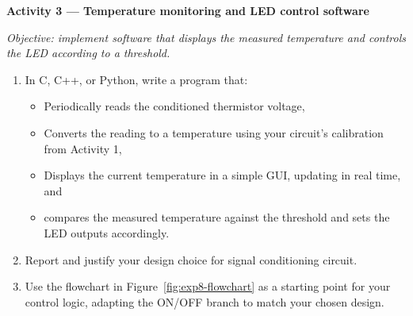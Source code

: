 \begin{procedure}
  \textbf{Activity 3 --- Temperature monitoring and LED control software}\vspace{2pt}

  \textit{Objective: implement software that displays the measured temperature and controls the LED according to a threshold.}

  \begin{enumerate}
    \item In C, C++, or Python, write a program that:
          \begin{itemize}
            \item Periodically reads the conditioned thermistor voltage,
            \item Converts the reading to a temperature using your circuit's calibration from Activity 1,
            \item Displays the current temperature in a simple GUI, updating in real time, and
            \item compares the measured temperature against the threshold and sets the LED outputs accordingly.
          \end{itemize}
    \item Report and justify your design choice for signal conditioning circuit.
    \item Use the flowchart in Figure~\ref{fig:exp8-flowchart} as a starting point for your control logic, adapting the ON/OFF branch to match your chosen design.
  \end{enumerate}

  \begin{boxedfigure}
    \centering
\end{boxedfigure}
\end{procedure}
